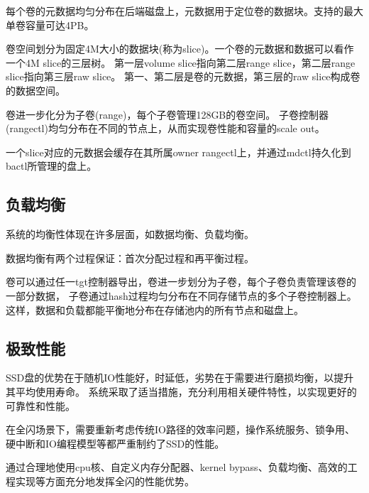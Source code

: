 每个卷的元数据均匀分布在后端磁盘上，元数据用于定位卷的数据块。支持的最大单卷容量可达4PB。

卷空间划分为固定4M大小的数据块(称为slice)。一个卷的元数据和数据可以看作一个4M slice的三层树。
第一层volume slice指向第二层range slice，第二层range slice指向第三层raw slice。
第一、第二层是卷的元数据，第三层的raw slice构成卷的数据空间。

卷进一步化分为子卷(range)，每个子卷管理128GB的卷空间。
子卷控制器(rangectl)均匀分布在不同的节点上，从而实现卷性能和容量的scale out。

一个slice对应的元数据会缓存在其所属owner rangectl上，并通过mdctl持久化到bactl所管理的盘上。

\subsection{负载均衡}

系统的均衡性体现在许多层面，如数据均衡、负载均衡。

数据均衡有两个过程保证：首次分配过程和再平衡过程。

卷可以通过任一tgt控制器导出，卷进一步划分为子卷，每个子卷负责管理该卷的一部分数据，
子卷通过hash过程均匀分布在不同存储节点的多个子卷控制器上。
这样，数据和负载都能平衡地分布在存储池内的所有节点和磁盘上。



\subsection{极致性能}

SSD盘的优势在于随机IO性能好，时延低，劣势在于需要进行磨损均衡，以提升其平均使用寿命。
系统采取了适当措施，充分利用相关硬件特性，以实现更好的可靠性和性能。

在全闪场景下，需要重新考虑传统IO路径的效率问题，操作系统服务、锁争用、硬中断和IO编程模型等都严重制约了SSD的性能。

通过合理地使用cpu核、自定义内存分配器、kernel bypass、负载均衡、高效的工程实现等方面充分地发挥全闪的性能优势。


